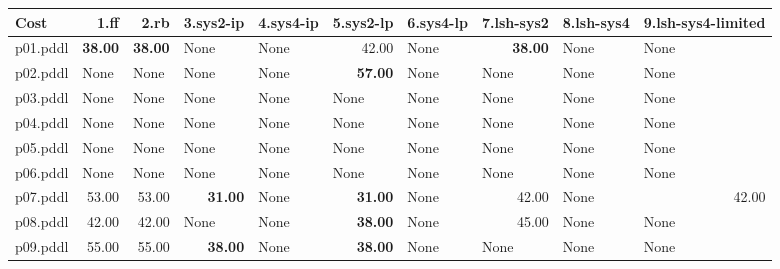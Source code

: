 \documentclass{article}
\begin{document}
\begin{tabular}{@{}lrrrrrrrrr@{}}
Cost & 1.ff & 2.rb & 3.sys2-ip & 4.sys4-ip & 5.sys2-lp & 6.sys4-lp & 7.lsh-sys2 & 8.lsh-sys4 & 9.lsh-sys4-limited \\
\midrule
p01.pddl & \textbf{38.00} & \textbf{38.00} & \multicolumn{1}{|l|}{None} & \multicolumn{1}{|l|}{None} & 42.00 & \multicolumn{1}{|l|}{None} & \textbf{38.00} & \multicolumn{1}{|l|}{None} & \multicolumn{1}{|l|}{None} \\
p02.pddl & \multicolumn{1}{|l|}{None} & \multicolumn{1}{|l|}{None} & \multicolumn{1}{|l|}{None} & \multicolumn{1}{|l|}{None} & \textbf{57.00} & \multicolumn{1}{|l|}{None} & \multicolumn{1}{|l|}{None} & \multicolumn{1}{|l|}{None} & \multicolumn{1}{|l|}{None} \\
p03.pddl & \multicolumn{1}{|l|}{None} & \multicolumn{1}{|l|}{None} & \multicolumn{1}{|l|}{None} & \multicolumn{1}{|l|}{None} & \multicolumn{1}{|l|}{None} & \multicolumn{1}{|l|}{None} & \multicolumn{1}{|l|}{None} & \multicolumn{1}{|l|}{None} & \multicolumn{1}{|l|}{None} \\
p04.pddl & \multicolumn{1}{|l|}{None} & \multicolumn{1}{|l|}{None} & \multicolumn{1}{|l|}{None} & \multicolumn{1}{|l|}{None} & \multicolumn{1}{|l|}{None} & \multicolumn{1}{|l|}{None} & \multicolumn{1}{|l|}{None} & \multicolumn{1}{|l|}{None} & \multicolumn{1}{|l|}{None} \\
p05.pddl & \multicolumn{1}{|l|}{None} & \multicolumn{1}{|l|}{None} & \multicolumn{1}{|l|}{None} & \multicolumn{1}{|l|}{None} & \multicolumn{1}{|l|}{None} & \multicolumn{1}{|l|}{None} & \multicolumn{1}{|l|}{None} & \multicolumn{1}{|l|}{None} & \multicolumn{1}{|l|}{None} \\
p06.pddl & \multicolumn{1}{|l|}{None} & \multicolumn{1}{|l|}{None} & \multicolumn{1}{|l|}{None} & \multicolumn{1}{|l|}{None} & \multicolumn{1}{|l|}{None} & \multicolumn{1}{|l|}{None} & \multicolumn{1}{|l|}{None} & \multicolumn{1}{|l|}{None} & \multicolumn{1}{|l|}{None} \\
p07.pddl & 53.00 & 53.00 & \textbf{31.00} & \multicolumn{1}{|l|}{None} & \textbf{31.00} & \multicolumn{1}{|l|}{None} & 42.00 & \multicolumn{1}{|l|}{None} & 42.00 \\
p08.pddl & 42.00 & 42.00 & \multicolumn{1}{|l|}{None} & \multicolumn{1}{|l|}{None} & \textbf{38.00} & \multicolumn{1}{|l|}{None} & 45.00 & \multicolumn{1}{|l|}{None} & \multicolumn{1}{|l|}{None} \\
p09.pddl & 55.00 & 55.00 & \textbf{38.00} & \multicolumn{1}{|l|}{None} & \textbf{38.00} & \multicolumn{1}{|l|}{None} & \multicolumn{1}{|l|}{None} & \multicolumn{1}{|l|}{None} & \multicolumn{1}{|l|}{None} \\

\end{tabular}
\end{document}
